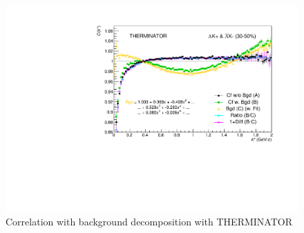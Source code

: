 \documentclass[../AnalysisNoteJBuxton.tex]{subfiles}
\begin{document}
\begin{figure}[h]
  \centering
  \includegraphics[width=\textwidth]{5_Fitting/Figures/CompareBgds_Full_LamKchPwConj_3050.pdf}
  \caption[Correlation with background decomposition (THERM)]{Correlation with background decomposition with THERMINATOR}
  \label{fig:THERMCfBgdDecomposition}
\end{figure}
\end{document}
